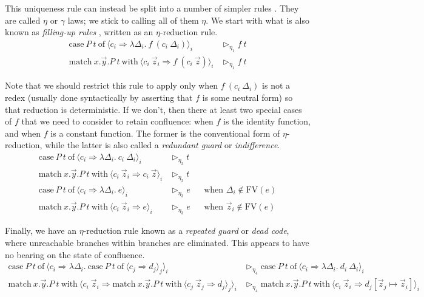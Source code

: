 \documentclass{report}
\newcommand{\const}[1]{\text{#1}}
\newcommand{\meta}[1]{\text{#1}}
\newcommand{\case}{\const{case}}
\newcommand{\of}{\const{of}}
\newcommand{\match}{\const{match}}
\newcommand{\with}{\const{with}}
\begin{document}
This uniqueness rule can instead be split into a number of simpler rules \citep{eta}. They are called $\eta$ or $\gamma$ laws; we stick to calling all of them $\eta$. We start with what is also known as \emph{filling-up rules} \citep{well-ordering}, written as an $\eta$-reduction rule.
%
\begin{align*}
    \case ~ P ~ t ~ \of ~ \langle c_i \Rightarrow \lambda \Delta_i. ~ f ~ (c_i ~ \Delta_i) \rangle_i &\rhd_{\eta_1} f ~ t \\
    \match ~ x.\Vec{y}.P ~ t ~ \with ~ \langle c_i ~ \vec{z}_i \Rightarrow f ~ (c_i ~ \vec{z}) \rangle_i &\rhd_{\eta_1} f ~ t
\end{align*}

Note that we should restrict this rule to apply only when $f ~ (c_i ~ \Delta_i)$ is not a redex (usually done syntactically by asserting that $f$ is some neutral form) so that reduction is deterministic. If we don't, then there at least two special cases of $f$ that we need to consider to retain confluence: when $f$ is the identity function, and when $f$ is a constant function. The former is the conventional form of $\eta$-reduction, while the latter is also called a \emph{redundant guard} or \emph{indifference}.
%
\begin{align*}
    \case ~ P ~ t ~ \of ~ \langle c_i \Rightarrow \lambda \Delta_i. ~ c_i ~ \Delta_i \rangle_i &\rhd_{\eta_2} t \\
    \match ~ x.\Vec{y}.P ~ t ~ \with ~ \langle c_i ~ \vec{z}_i \Rightarrow c_i ~ \vec{z} \rangle_i &\rhd_{\eta_2} t \\
    \case ~ P ~ t ~ \of ~ \langle c_i \Rightarrow \lambda \Delta_i. ~ e \rangle_i &\rhd_{\eta_3} e && \text{when $\Delta_i \notin \meta{FV}(e)$} \\
    \match ~ x.\Vec{y}.P ~ t ~ \with ~ \langle c_i ~ \vec{z}_i \Rightarrow e \rangle_i &\rhd_{\eta_3} e && \text{when $\vec{z}_i \notin \meta{FV}(e)$}
\end{align*}

Finally, we have an $\eta$-reduction rule known as a \emph{repeated guard} or \emph{dead code}, where unreachable branches within branches are eliminated. This appears to have no bearing on the state of confluence.
%
\begin{align*}
    \case ~ P ~ t ~ \of ~ \langle c_i \Rightarrow \lambda \Delta_i. ~ \case ~ P ~ t ~ \of ~ \langle c_j \Rightarrow d_j \rangle_j \rangle_i &\rhd_{\eta_4} \case ~ P ~ t ~ \of ~ \langle c_i \Rightarrow \lambda \Delta_i. ~ d_i ~ \Delta_i \rangle_i \\
    \match ~ x.\Vec{y}.P ~ t ~ \with ~ \langle c_i ~ \Vec{z}_i \Rightarrow \match ~ x.\Vec{y}.P ~ t ~ \with ~ \langle c_j ~ \Vec{z}_j \Rightarrow d_j \rangle_j \rangle_i &\rhd_{\eta_4} \match ~ x.\Vec{y}.P ~ t ~ \with ~ \langle c_i ~ \Vec{z}_i \Rightarrow d_j[\Vec{z}_j \mapsto \Vec{z}_i] \rangle_i
\end{align*}
\end{document}
